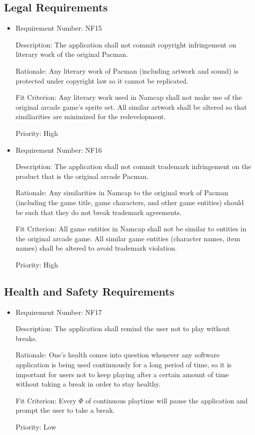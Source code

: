 \documentclass[12pt, titlepage]{article}
\begin{document}
\subsection{Legal Requirements}
\begin{itemize}
	\item
	Requirement Number: NF15

	Description: The application shall not commit copyright infringement on literary work of the original Pacman.

	Rationale: Any literary work of Pacman (including artwork and sound) is protected under copyright law so it cannot be replicated.

	Fit Criterion: Any literary work used in Namcap shall not make use of the original arcade game's sprite set. All similar artwork shall be altered so that similiarities are minimized for the redevelopment.

	Priority: High

	\item
	Requirement Number: NF16

	Description: The application shall not commit trademark infringement on the product that is the original arcade Pacman.

	Rationale: Any similarities in Namcap to the original work of Pacman (including the game title, game characters, and other game entities) should be such that they do not break trademark agreements.

	Fit Criterion: All game entities in Namcap shall not be similar to entities in the original arcade game. All similar game entities (character names, item names) shall be altered to avoid trademark violation.

	Priority: High
\end{itemize}

\subsection{Health and Safety Requirements}
\begin{itemize}
	\item
	Requirement Number: NF17

	Description: The application shall remind the user not to play without breaks.

	Rationale: One's health comes into question whenever any software application is being used continuously for a long period of time, so it is important for users not to keep playing after a certain amount of time without taking a break in order to stay healthy.

	Fit Criterion: Every $\hyperref[tab:constants]{\Phi}$ of continuous playtime will pause the application and prompt the user to take a break.

	Priority: Low
\end{itemize}
\end{document}
